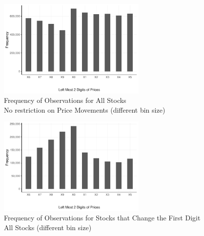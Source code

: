 \begin{figure}[hp]
	\centering%
	\caption{Frequency of Observations for All Stocks  \\ No restriction on Price Movements (different bin size)}%
	\label{fig:freq_all_obs}%
	\includegraphics[width=0.65\textwidth]{figures/left2_second_count.pdf}
	\fignote{}
\end{figure}

\begin{figure}[hp]
	\centering%
	\caption{Frequency of Observations for Stocks that Change the First Digit \\ All Stocks (different bin size)}%
	\label{fig:freq_inc}%
	\includegraphics[width=0.65\textwidth]{figures/left2_second_increase_count.pdf}
	\fignote{}
\end{figure}






